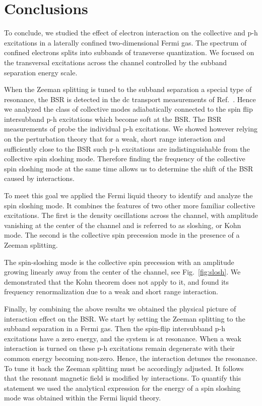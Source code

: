 \chapter{Conclusions}
\label{sec:Conclusions}

To conclude, we studied the effect of electron interaction on the collective and p-h excitations in a laterally confined two-dimensional Fermi gas.
The spectrum of confined electrons splits into subbands of transverse quantization.
We focused on the transversal excitations across the channel controlled by the subband separation energy scale.

When the Zeeman splitting is tuned to the subband separation a special type of  resonance, the BSR is detected in the dc transport measurements of Ref.~\cite{Frolov2009,Frolov2009a}.
Hence we analyzed the class of collective modes adiabatically connected to the spin flip intersubband p-h excitations which become soft at the BSR. 
The BSR measurements of \cite{Frolov2009} probe the individual p-h excitations.
We showed however relying on the perturbation theory that for a weak, short range interaction and sufficiently close to the BSR such p-h excitations are indistinguishable from the collective spin sloshing mode.
Therefore finding the frequency of the collective spin sloshing mode at the same time allows us to determine the shift of the BSR caused by interactions.

To meet this goal we applied the Fermi liquid theory to identify and analyze the spin sloshing mode.
It combines the features of two other more familiar collective excitations.
The first is the density oscillations across the channel, with amplitude vanishing at the center of the channel and is referred to as sloshing, or Kohn mode. 
The second is the collective spin precession mode in the presence of a Zeeman splitting.

The spin-sloshing mode is the collective spin precession with an amplitude growing linearly away from the center of the channel, see Fig.~\ref{fig:slosh}.
We demonstrated that the Kohn theorem does not apply to it, and found its frequency renormalization due to a weak and short range interaction.

Finally, by combining the above results we obtained the physical picture of interaction effect on the BSR.
We start by setting the Zeeman splitting to the subband separation in a Fermi gas.
Then the spin-flip intersubband p-h excitations have a zero energy, and the system is at resonance.
When a weak interaction is turned on these p-h excitations remain degenerate with their common energy becoming non-zero.
Hence, the interaction detunes the resonance.
To tune it back the Zeeman splitting must be accordingly adjusted.
It follows that the resonant magnetic field is modified by interactions. 
To quantify this statement we used the analytical expression for the energy of a spin sloshing mode was obtained within the Fermi liquid theory.

